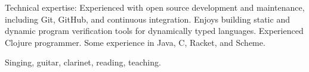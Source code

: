 \documentclass[10pt,a4paper]{article}
\begin{document}

\inlineheadsection  %
  {Technical expertise:}
  {Experienced with open source development and maintenance, 
    including Git, GitHub, and continuous integration.
    Enjoys building static and dynamic
    program verification tools for dynamically typed languages.
    Experienced Clojure programmer.
    Some experience in Java, C, Racket, and Scheme.
  }


{\bodytext
  {Singing, guitar, clarinet, reading, teaching.}
}
\end{document}
